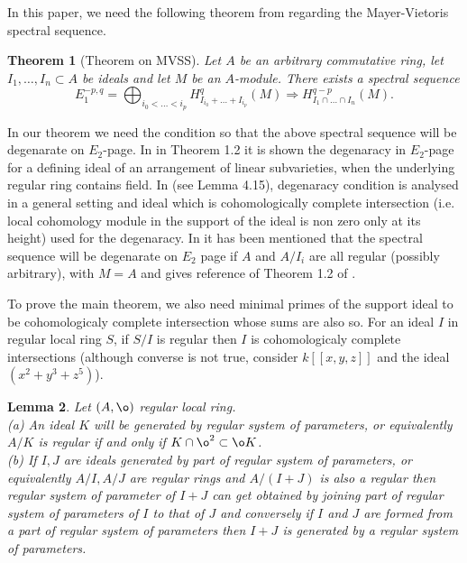 \documentclass[10pt]{amsart}
\theoremstyle{plain}
\newtheorem{thm}{Theorem}[section]
\newtheorem{lemma}[thm]{Lemma}
\theoremstyle{definition}
\begin{document}
In this paper, we need the following theorem from \cite{Ly4} regarding the Mayer-Vietoris spectral sequence. 

\begin{thm}[Theorem on MVSS]\label{MV}
Let $A$ be an arbitrary commutative ring, let $I_1,\dots,I_n\subset A$ be ideals and
let $M$ be an $A$-module. There exists a spectral sequence
$$E_1^{-p,q}=\bigoplus_{i_0<\dots<i_p}H^q_{I_{i_0}+\dots+I_{i_p}}(M)
\Longrightarrow H^{q-p}_{I_1\cap\dots\cap I_n}(M).$$
\end{thm}

In our theorem we need the condition so that the above spectral sequence will be degenarate on $E_2$-page. In \cite{AGZ} in Theorem 1.2 it is shown the degenaracy in $E_2$-page for a defining ideal of an arrangement of linear subvarieties, when the underlying regular ring contains field. In \cite{ABZ} (see Lemma 4.15), degenaracy condition is analysed in a general setting and ideal which is cohomologically complete intersection (i.e. local cohomology module in the support of the ideal is non zero only at its height) used for the degenaracy. In \cite{Ly4} it has been mentioned that the spectral sequence will be degenarate on $E_2$ page if $A$ and $A/I_i$ are all regular (possibly arbitrary), with $M=A$ and gives reference of Theorem 1.2 of \cite{AGZ}.

To prove the main theorem, we also need minimal primes of the support ideal to be cohomologicaly complete intersection whose sums are also so. For an ideal $I$ in regular local ring $S$, if $S/I$ is regular then $I$ is cohomologicaly complete intersections (although converse is not true, consider $k[[x,y,z]]$ and the ideal $(x^2 +y^3 + z^5)$). 

\begin{lemma}
Let $(A,\o)$ regular local ring.\\ 
(a) An ideal $K$ will be generated by regular system of parameters, or equivalently $A/K$ is regular if and only if $K\cap {\o}^2\subset \o K$.\\%
(b) If $I, J$ are ideals generated by part of regular system of parameters, or equivalently $A/I, A/J$ are regular rings and $A/(I+J)$ is also a regular then regular system of parameter of $I+J$ can get obtained by joining part of regular system of parameters of $I$ to that of $J$ and conversely if $I$ and $J$ are formed from a part of regular system of parameters then $I+J$ is generated by a regular system of parameters. 
\end{lemma}
\end{document}
